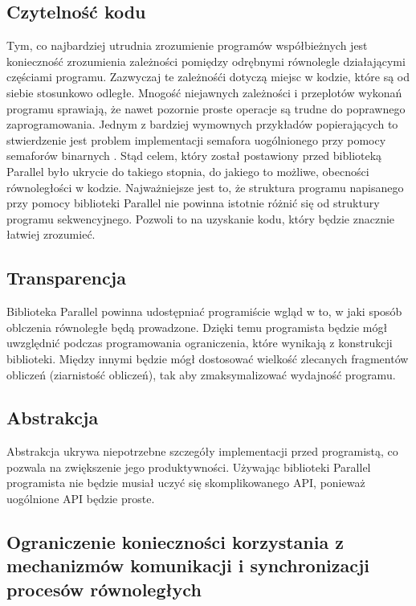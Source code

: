 \subsection{Czytelność kodu}

  Tym, co najbardziej utrudnia zrozumienie programów współbieżnych jest konieczność zrozumienia zależności pomiędzy odrębnymi równolegle działającymi częściami programu.
  Zazwyczaj te zależnośći dotyczą miejsc w kodzie, które są od siebie stosunkowo odległe.
  Mnogość niejawnych zależności i przeplotów wykonań programu sprawiają, że nawet pozornie proste operacje są trudne do poprawnego zaprogramowania.
  Jednym z bardziej wymownych przykładów popierających to stwierdzenie jest problem implementacji semafora uogólnionego przy pomocy semaforów binarnych \cite{gensem}.
  Stąd celem, który został postawiony przed biblioteką Parallel było ukrycie do takiego stopnia, do jakiego to możliwe, obecności równoległości w kodzie.
  Najważniejsze jest to, że struktura programu napisanego przy pomocy biblioteki Parallel nie powinna istotnie różnić się od struktury programu sekwencyjnego.
  Pozwoli to na uzyskanie kodu, który będzie znacznie łatwiej zrozumieć.

\subsection{Transparencja}

  Biblioteka Parallel powinna udostępniać programiście wgląd w to, w jaki sposób oblczenia równoległe będą prowadzone.
  Dzięki temu programista będzie mógł uwzględnić podczas programowania ograniczenia, które wynikają z konstrukcji biblioteki.
  Między innymi będzie mógł dostosować wielkość zlecanych fragmentów obliczeń (ziarnistość obliczeń), tak aby zmaksymalizować wydajność programu.
  
\subsection{Abstrakcja}

  Abstrakcja ukrywa niepotrzebne szczegóły implementacji przed programistą, co pozwala na zwiększenie jego produktywności.
  Używając biblioteki Parallel programista nie będzie musiał uczyć się skomplikowanego API, ponieważ uogólnione API będzie proste.

\subsection{Ograniczenie konieczności korzystania z mechanizmów komunikacji i synchronizacji procesów równoległych}

